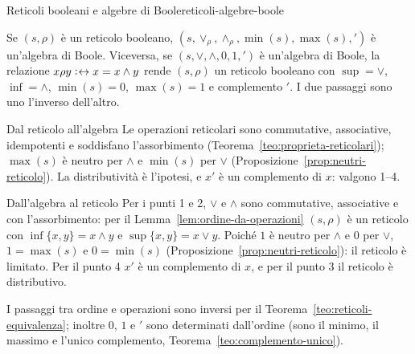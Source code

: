 \begin{concetto}
\begin{Teorema}{Reticoli booleani e algebre di Boole}{reticoli-algebre-boole}
    \begin{prerequisiti}
    \end{prerequisiti}
    Se $(s, \rho)$ è un reticolo booleano, $(s, \vee_\rho, \wedge_\rho, \min(s), \max(s), {}')$ è un'algebra di Boole. Viceversa, se $(s, \vee, \wedge, 0, 1, {}')$ è
    un'algebra di Boole, la relazione $x \rho y \mathrel{\vcentcolon\mkern1mu\leftrightarrow} x = x \wedge y$ rende $(s, \rho)$ un reticolo booleano con $\sup = \vee$, $\inf = \wedge$, $\min(s) = 0$,
    $\max(s) = 1$ e complemento ${}'$. I due passaggi sono uno l'inverso dell'altro.
\end{Teorema}
\begin{dimostrazione}
    \begin{caso}{Dal reticolo all'algebra}
        Le operazioni reticolari sono commutative, associative, idempotenti e soddisfano l'assorbimento (Teorema~\ref{teo:proprieta-reticolari}); $\max(s)$ è neutro
        per $\wedge$ e $\min(s)$ per $\vee$ (Proposizione~\ref{prop:neutri-reticolo}). La distributività è l'ipotesi, e $x'$ è un complemento di $x$: valgono 1--4.
    \end{caso}
    \begin{caso}{Dall'algebra al reticolo}
        Per i punti 1 e 2, $\vee$ e $\wedge$ sono commutative, associative e con l'assorbimento: per il Lemma~\ref{lem:ordine-da-operazioni} $(s, \rho)$ è un reticolo
        con $\inf\{x, y\} = x \wedge y$ e $\sup\{x, y\} = x \vee y$. Poiché $1$ è neutro per $\wedge$ e $0$ per $\vee$, $1 = \max(s)$ e $0 = \min(s)$ (Proposizione~\ref{prop:neutri-reticolo}):
        il reticolo è limitato. Per il punto 4 $x'$ è un complemento di $x$, e per il punto 3 il reticolo è distributivo.
    \end{caso}
    I passaggi tra ordine e operazioni sono inversi per il Teorema~\ref{teo:reticoli-equivalenza}; inoltre $0$, $1$ e ${}'$ sono determinati dall'ordine (sono il
    minimo, il massimo e l'unico complemento, Teorema~\ref{teo:complemento-unico}).
\end{dimostrazione}
\end{concetto}

